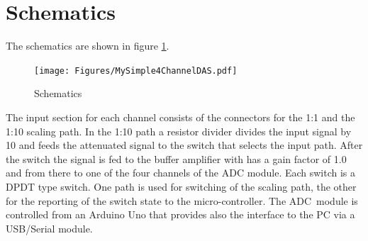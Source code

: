 \documentclass[11pt, oneside]{scrartcl}   	%
\begin{document}
\section{Schematics} 
The schematics are shown in figure \ref{fig:Schematics}.
\begin{figure}[htbp]
	\centering
	\texttt{[image: Figures/MySimple4ChannelDAS.pdf]}
	\caption[Schematics]{Schematics}
	\label{fig:Schematics}
\end{figure}
The input section for each channel consists of the connectors for the 1:1 and the 1:10 scaling path. In the 1:10 path a resistor divider divides the input signal
by 10 and feeds the attenuated signal to the switch that selects the input path. After the switch the signal is fed to the buffer amplifier with has a gain factor of 1.0 and from there to one of the four channels of the ADC module.
Each switch is a DPDT type switch. One path is used for switching of the scaling path, the other for the reporting of the switch state to the micro-controller. 
The ADC module is controlled from an Arduino Uno that provides also the interface to the PC via a USB/Serial module.
\end{document}
